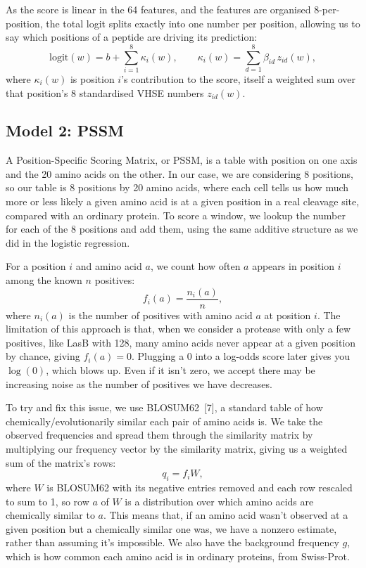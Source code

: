 \documentclass[10pt,a4paper]{article}
\numberwithin{equation}{section}
\newcommand{\cit}[1]{[#1]}
\begin{document}
As the score is linear in the 64 features, and the features are organised 8-per-position, the total logit splits exactly into one number per position, allowing us to say which positions of a peptide are driving its prediction:
\begin{equation}
\mathrm{logit}(w)=b+\sum_{i=1}^{8}\kappa_i(w),\qquad \kappa_i(w)=\sum_{d=1}^{8}\beta_{id}\,z_{id}(w),
\label{eq:decomp}
\end{equation}
where $\kappa_i(w)$ is position $i$'s contribution to the score, itself a weighted sum over that position's 8 standardised VHSE numbers $z_{id}(w)$.

\subsection{Model 2: PSSM}

A Position-Specific Scoring Matrix, or PSSM, is a table with position on one axis and the 20 amino acids on the other. In our case, we are considering 8 positions, so our table is 8 positions by 20 amino acids, where each cell tells us how much more or less likely a given amino acid is at a given position in a real cleavage site, compared with an ordinary protein. To score a window, we lookup the number for each of the 8 positions and add them, using the same additive structure as we did in the logistic regression.

For a position $i$ and amino acid $a$, we count how often $a$ appears in position $i$ among the known $n$ positives:
\begin{equation}
f_i(a) = \frac{n_i(a)}{n},
\label{eq:freq}
\end{equation}
where $n_i(a)$ is the number of positives with amino acid $a$ at position $i$. The limitation of this approach is that, when we consider a protease with only a few positives, like LasB with 128, many amino acids never appear at a given position by chance, giving $f_i(a)=0$. Plugging a 0 into a log-odds score later gives you $\log(0)$, which blows up. Even if it isn't zero, we accept there may be increasing noise as the number of positives we have decreases.

To try and fix this issue, we use BLOSUM62~\cit{7}, a standard table of how chemically/evolutionarily similar each pair of amino acids is. We take the observed frequencies and spread them through the similarity matrix by multiplying our frequency vector by the similarity matrix, giving us a weighted sum of the matrix's rows:
\begin{equation}
q_i = f_i W,
\label{eq:spread}
\end{equation}
where $W$ is BLOSUM62 with its negative entries removed and each row rescaled to sum to 1, so row $a$ of $W$ is a distribution over which amino acids are chemically similar to $a$. This means that, if an amino acid wasn't observed at a given position but a chemically similar one was, we have a nonzero estimate, rather than assuming it's impossible. We also have the background frequency $g$, which is how common each amino acid is in ordinary proteins, from Swiss-Prot.
\end{document}
